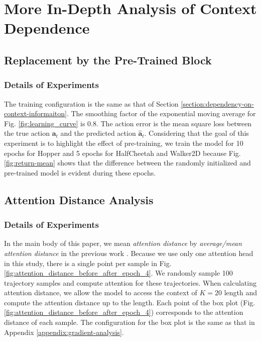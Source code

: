\documentclass{article}
\begin{document}
\section{More In-Depth Analysis of Context Dependence}
\label{appendix:internal-analysis-to-see-the-dependence-on-context}

\subsection{Replacement by the Pre-Trained Block}
\label{appendix:replacement}

\subsubsection{Details of Experiments}
\label{appendix:detail-of-experiments-replacement}
The training configuration is the same as that of Section \ref{section:dependency-on-context-informaiton}.
The smoothing factor of the exponential moving average for Fig. \ref{fig:learning_curve} is 0.8. The action error is the mean square loss between the true action $\bm{a}_t$ and the predicted action $\hat{\bm{a}}_t$. Considering that the goal of this experiment is to highlight the effect of pre-training, we train the model for 10 epochs for Hopper and 5 epochs for HalfCheetah and Walker2D because Fig. \ref{fig:return-mean} shows that the difference between the randomly initialized and pre-trained model is evident during these epochs. 

\subsection{Attention Distance Analysis}
\label{appendix:attention-distance}

\subsubsection{Details of Experiments}
\label{appendix:detail-of-experiments-attention-distance}
In the main body of this paper, we mean \textit{attention distance} by \textit{average/mean attention distance} in the previous work \cite{dosovitskiy2020image,raghu2021vision}. Because we use only one attention head in this study, there is a single point per sample in Fig. \ref{fig:attention_distance_before_after_epoch_4}. We randomly sample 100 trajectory samples and compute attention for these trajectories. When calculating attention distance, we allow the model to access the context of $K=20$ length and compute the attention distance up to the length. Each point of the box plot (Fig. \ref{fig:attention_distance_before_after_epoch_4}) corresponds to the attention distance of each sample. The configuration for the box plot is the same as that in Appendix \ref{appendix:gradient-analysis}.
\end{document}
